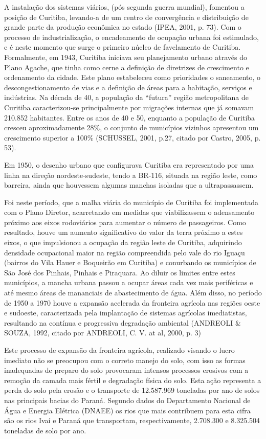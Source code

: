 	A instalação dos sistemas viários, (pós segunda guerra mundial), fomentou a posição de Curitiba, levando-a de um centro de convergência e distribuição de grande parte da produção econômica no estado (IPEA, 2001, p. 73). Com o processo de industrialização, o encadeamento de ocupação urbana foi estimulado, e é neste momento que surge o primeiro núcleo de favelamento de Curitiba. Formalmente, em 1943, Curitiba iniciava seu planejamento urbano através do Plano Agache, que tinha como cerne a definição de diretrizes de crescimento e ordenamento da cidade. 
	Este plano estabeleceu como prioridades o saneamento, o descongestionamento de vias e a definição de áreas para a habitação, serviços e indústrias. Na década de 40, a população da “futura” região metropolitana de Curitiba caracterizou-se principalmente por migrações internas que já somavam 210.852 habitantes. Entre os anos de 40 e 50, enquanto a população de Curitiba cresceu aproximadamente 28\%, o conjunto de municípios vizinhos apresentou um crescimento superior a 100\% (SCHUSSEL, 2001, p.27, citado por Castro, 2005, p. 53).
	
	Em 1950, o desenho urbano que configurava Curitiba era representado por uma linha na direção nordeste-sudeste, tendo a BR-116, situada na região leste, como barreira, ainda que houvessem algumas manchas isoladas que a ultrapassassem.
	
	Foi neste período, que a malha viária do município de Curitiba foi implementada com o Plano Diretor, acarretando em medidas que viabilizassem o adensamento próximo aos eixos rodoviários para aumentar o número de passageiros. Como resultado, houve um aumento significativo do valor da terra próximo a estes eixos, o que impulsionou a ocupação da região leste de Curitiba, adquirindo densidade ocupacional maior na região compreendida pelo vale do rio Iguaçu (bairros do Vila Hauer e Boqueirão em Curitiba) e conurbando os municípios de São José dos Pinhais, Pinhais e Piraquara. Ao diluir os limites entre estes municípios, a mancha urbana passou a ocupar áreas cada vez mais periféricas e até mesmo áreas de mananciais de abastecimento de água.
	Além disso, no período de 1950 a 1970 houve a expansão acelerada da fronteira agrícola nas regiões oeste e sudoeste, caracterizada pela implantação de sistemas agrícolas imediatistas, resultando na contínua e progressiva degradação ambiental (ANDREOLI \& SOUZA, 1992, citado por ANDREOLI, C. V. at al, 2000, p. 3)
	
	Este processo de expansão da fronteira agrícola, realizado visando o lucro imediato não se preocupou com o correto manejo do solo, com isso as formas inadequadas de preparo do solo provocaram intensos processos erosivos com a remoção da camada mais fértil e degradação física do solo. Esta ação representa a perda do solo pela erosão e o transporte de 12.587.969 toneladas por ano de solos nas principais bacias do Paraná. Segundo dados do Departamento Nacional de Água e Energia Elétrica (DNAEE) os rios que mais contribuem para esta cifra são os rios Ivaí e Paraná que transportam, respectivamente, 2.708.300 e 8.325.504 toneladas de solo por ano.
	
